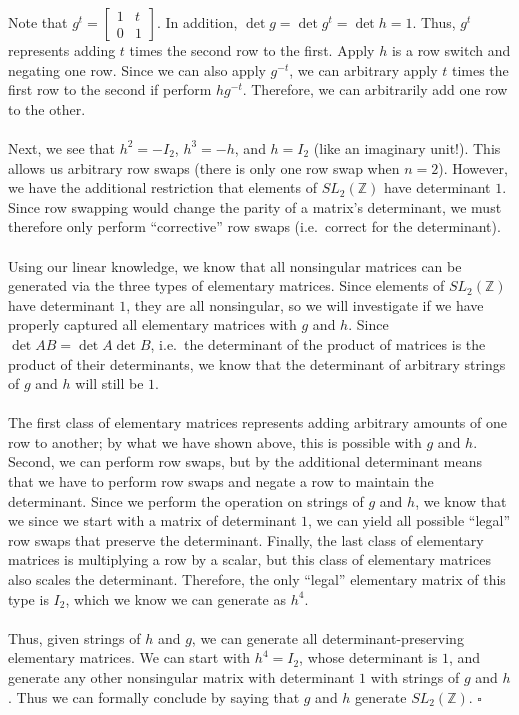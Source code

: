 \documentclass[letterpaper]{article}
\newcommand*{\QED}{\hfill\ensuremath{\square}}%
\begin{document}
Note that $ g^t = \begin{bmatrix} 1 & t \\ 0 & 1 \end{bmatrix} $.
In addition, $ \det{g} = \det{g^t} = \det{h} = 1 $.
Thus, $ g^t $ represents adding $ t $ times the second row to the first.
Apply $ h $ is a row switch and negating one row.
Since we can also apply $ g^{-t} $, we can arbitrary apply $ t $ times the first row to the second if perform $ hg^{-t} $.
Therefore, we can arbitrarily add one row to the other.
\\ \\
Next, we see that $ h^2 = -I_2 $, $ h^3 = -h $, and $ h = I_2 $ (like an imaginary unit!).
This allows us arbitrary row swaps (there is only one row swap when $ n = 2 $).
However, we have the additional restriction that elements of $ SL_2(\mathbb{Z}) $ have determinant $ 1 $.
Since row swapping would change the parity of a matrix's determinant, we must therefore only perform ``corrective'' row swaps (i.e.\ correct for the determinant).
\\ \\
Using our linear knowledge, we know that all nonsingular matrices can be generated via the three types of elementary matrices.
Since elements of $ SL_2(\mathbb{Z}) $ have determinant $ 1 $, they are all nonsingular, so we will investigate if we have properly captured all elementary matrices with $ g $ and $ h $.
Since $ \det{AB} = \det{A}\det{B} $, i.e.\ the determinant of the product of matrices is the product of their determinants, we know that the determinant of arbitrary strings of $ g $ and $ h $ will still be $ 1 $.
\\ \\
The first class of elementary matrices represents adding arbitrary amounts of one row to another; by what we have shown above, this is possible with $ g $ and $ h $.
Second, we can perform row swaps, but by the additional determinant means that we have to perform row swaps and negate a row to maintain the determinant.
Since we perform the operation on strings of $ g $ and $ h $, we know that we since we start with a matrix of determinant $ 1 $, we can yield all possible ``legal'' row swaps that preserve the determinant.
Finally, the last class of elementary matrices is multiplying a row by a scalar, but this class of elementary matrices also scales the determinant.
Therefore, the only ``legal'' elementary matrix of this type is $ I_2 $, which we know we can generate as $ h^4 $.
\\ \\
Thus, given strings of $ h $ and $ g $, we can generate all determinant-preserving elementary matrices.
We can start with $ h^4 = I_2 $, whose determinant is $ 1 $, and generate any other nonsingular matrix with determinant $ 1 $ with strings of $ g $ and $ h $.
Thus we can formally conclude by saying that $ g $ and $ h $ generate $ SL_2(\mathbb{Z}) $.
\QED{}
\end{document}
